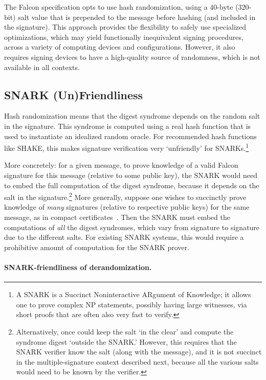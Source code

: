 \documentclass[11pt]{article}
\begin{document}
The Falcon specification opts to use hash randomization, using a
$40$-byte ($320$-bit) salt value that is prepended to the message
before hashing (and included in the signature). This approach provides
the flexibility to safely use specialized optimizations, which may
yield functionally inequivalent signing procedures, across a variety
of computing devices and configurations. However, it also requires
signing devices to have a high-quality source of randomness, which is
not available in all contexts.

\subsection{SNARK (Un)Friendliness}
\label{sec:snark-unfriendliness}

Hash randomization means that the digest syndrome depends on the
random salt in the signature. This syndrome is computed using a real
hash function that is used to instantiate an idealized random
oracle. For recommended hash functions like SHAKE, this makes
signature verification very `unfriendly' for SNARKs.\footnote{A SNARK
  is a Succinct Noninteractive ARgument of Knowledge; it allows one to
  prove complex NP statements, possibly having large witnesses, via
  short proofs that are often also very fast to verify.}

More concretely: for a given message, to prove knowledge of a valid
Falcon signature for this message (relative to some public key), the
SNARK would need to embed the full computation of the digest syndrome,
because it depends on the salt in the
signature.\footnote{Alternatively, once could keep the salt `in the
  clear' and compute the syndrome digest `outside the SNARK.' However,
  this requires that the SNARK verifier know the salt (along with the
  message), and it is not succinct in the multiple-signature context
  described next, because all the various salts would need to be known
  by the verifier.}  More generally, suppose one wishes to succinctly
prove knowledge of \emph{many} signatures (relative to respective
public keys) for the same message, as in compact
certificates~\cite{DBLP:conf/sp/MicaliRVWZ21}. Then the SNARK must
embed the computations of \emph{all} the digest syndromes, which vary
from signature to signature due to the different salts. For existing
SNARK systems, this would require a prohibitive amount of computation
for the SNARK prover.

\paragraph{SNARK-friendliness of derandomization.}
\end{document}
